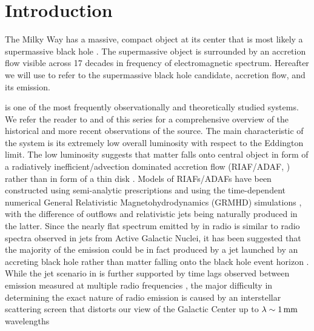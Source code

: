 \section{Introduction}
\label{sec:intro}

The Milky Way has a massive, compact object at its center that is most likely a supermassive black hole \citep{2019Sci...365..664D, 2019A&A...625L..10G}.
The supermassive object is surrounded by an accretion flow visible across 17 decades in frequency of electromagnetic spectrum.
Hereafter we will use \sgra to refer to the supermassive black hole candidate, accretion flow, and its emission.

\sgra is one of the most frequently observationally and theoretically studied systems.
We refer the reader to  and  of this series for a comprehensive overview of the historical and more recent observations of the source.
The main characteristic of the \sgra system is its extremely low overall luminosity with respect to the Eddington limit.
The low luminosity suggests that matter falls onto \sgra central object in form of a radiatively inefficient/advection dominated accretion flow (RIAF/ADAF, \citealt{1977ApJ...214..840I,1994ApJ...428L..13N, 1995ApJ...444..231N, 1995ApJ...452..710N, 1996A&AS..120C.287N, 1998ApJ...492..554N,2014ARA&A..52..529Y}) rather than in form of a thin disk \citep{1973A&A....24..337S}.
Models of RIAFs/ADAFs have been constructed using semi-analytic prescriptions \citep[e.g.,][]{1995Natur.374..623N,2000ApJ...541..234O, 2009ApJ...697...45B,2011ApJ...735..110B} and using the time-dependent numerical General Relativistic Magnetohydrodynamics (GRMHD) simulations \citep[e.g.,][]{2000ApJ...528..462H, 2003ApJ...589..458D, 2003ApJ...589..444G, 2007CQGra..24S.235G, 2012ApJS..201....9F, 2014ApJ...796...22F, 2016ApJS..225...22W, 2017ApJS..231...17A, 2018JPhCS1031a2008O, 2019A&A...629A..61O, 2019ApJS..243...26P}, with the difference of outflows and relativistic jets being naturally produced in the latter.
Since the nearly flat spectrum emitted by \sgra in radio is similar to radio spectra observed in jets from Active Galactic Nuclei, it has been suggested that the majority of the \sgra emission could be in fact produced by a jet launched by an accreting black hole rather than matter falling onto the black hole event horizon \citep{2000A&A...362..113F}.
While the jet scenario in \sgra is further supported by time lags observed between emission measured at multiple radio frequencies \citep{2021arXiv210713402B}, the major difficulty in determining the exact nature of \sgra radio emission is caused by an interstellar scattering screen that distorts our view of the Galactic Center up to $\lambda \sim 1\,\mathrm{mm}$ wavelengths
